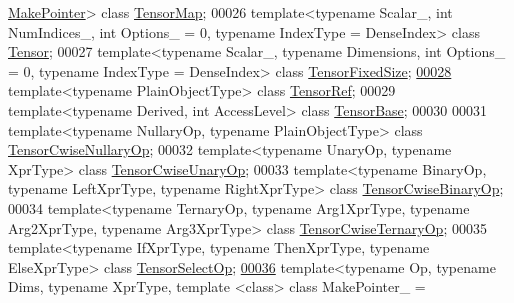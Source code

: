 \begin{DoxyCode}
      \hyperlink{struct_eigen_1_1_make_pointer}{MakePointer}> \textcolor{keyword}{class }\hyperlink{class_eigen_1_1_tensor_map}{TensorMap};
00026 \textcolor{keyword}{template}<\textcolor{keyword}{typename} Scalar\_, \textcolor{keywordtype}{int} NumIndices\_, \textcolor{keywordtype}{int} Options\_ = 0, \textcolor{keyword}{typename} IndexType = DenseIndex> \textcolor{keyword}{class }
      \hyperlink{class_eigen_1_1_tensor}{Tensor};
00027 \textcolor{keyword}{template}<\textcolor{keyword}{typename} Scalar\_, \textcolor{keyword}{typename} Dimensions, \textcolor{keywordtype}{int} Options\_ = 0, \textcolor{keyword}{typename} IndexType = DenseIndex> \textcolor{keyword}{class }
      \hyperlink{class_eigen_1_1_tensor_fixed_size}{TensorFixedSize};
\hyperlink{class_eigen_1_1_tensor_ref}{00028} \textcolor{keyword}{template}<\textcolor{keyword}{typename} PlainObjectType> \textcolor{keyword}{class }\hyperlink{class_eigen_1_1_tensor_ref}{TensorRef};
00029 \textcolor{keyword}{template}<\textcolor{keyword}{typename} Derived, \textcolor{keywordtype}{int} AccessLevel> \textcolor{keyword}{class }\hyperlink{class_eigen_1_1_tensor_base}{TensorBase};
00030 
00031 \textcolor{keyword}{template}<\textcolor{keyword}{typename} NullaryOp, \textcolor{keyword}{typename} PlainObjectType> \textcolor{keyword}{class }
      \hyperlink{class_eigen_1_1_tensor_cwise_nullary_op}{TensorCwiseNullaryOp};
00032 \textcolor{keyword}{template}<\textcolor{keyword}{typename} UnaryOp, \textcolor{keyword}{typename} XprType> \textcolor{keyword}{class }\hyperlink{class_eigen_1_1_tensor_cwise_unary_op}{TensorCwiseUnaryOp};
00033 \textcolor{keyword}{template}<\textcolor{keyword}{typename} BinaryOp, \textcolor{keyword}{typename} LeftXprType, \textcolor{keyword}{typename} RightXprType> \textcolor{keyword}{class }
      \hyperlink{class_eigen_1_1_tensor_cwise_binary_op}{TensorCwiseBinaryOp};
00034 \textcolor{keyword}{template}<\textcolor{keyword}{typename} TernaryOp, \textcolor{keyword}{typename} Arg1XprType, \textcolor{keyword}{typename} Arg2XprType, \textcolor{keyword}{typename} Arg3XprType> \textcolor{keyword}{class }
      \hyperlink{class_eigen_1_1_tensor_cwise_ternary_op}{TensorCwiseTernaryOp};
00035 \textcolor{keyword}{template}<\textcolor{keyword}{typename} IfXprType, \textcolor{keyword}{typename} ThenXprType, \textcolor{keyword}{typename} ElseXprType> \textcolor{keyword}{class }
      \hyperlink{class_eigen_1_1_tensor_select_op}{TensorSelectOp};
\hyperlink{class_eigen_1_1_tensor_reduction_op}{00036} \textcolor{keyword}{template}<\textcolor{keyword}{typename} Op, \textcolor{keyword}{typename} Dims, \textcolor{keyword}{typename} XprType, \textcolor{keyword}{template} <\textcolor{keyword}{class}> \textcolor{keyword}{class }MakePointer\_ = 

\end{DoxyCode}
